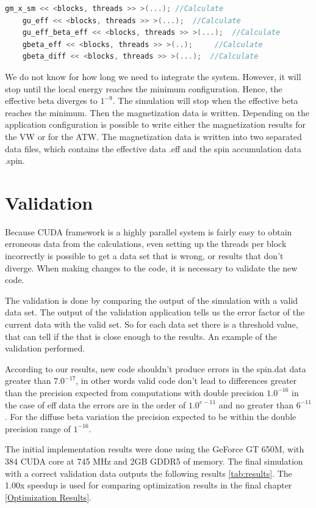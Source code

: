 \begin{lstlisting}[language=C++, label={lst:beta}, caption={Calculate effective beta}]
    gm_x_sm << <blocks, threads >> >(...); //Calculate
    gu_eff << <blocks, threads >> >(...);  //Calculate 
    gu_eff_beta_eff << <blocks, threads >> >(...); 	//Calculate
    gbeta_eff << <blocks, threads >> >(..); 	//Calculate
    gbeta_diff << <blocks, threads >> >(...);  //Calculate             
\end{lstlisting}


We do not know for how long we need to integrate the system. However, it will stop until the local energy reaches the minimum configuration. Hence, the effective beta diverges to $1^{-9}$. The simulation will stop when the effective beta reaches the minimum. Then the magnetization data is written. Depending on the application configuration is possible to write either the magnetization results for the VW or for the ATW. The magnetization data is written into two separated data files, which contains the effective data .eff and the spin accumulation data .spin.

\section{Validation}

Because CUDA framework is a highly parallel system is fairly easy to obtain erroneous data from the calculations, even setting up the threads per block incorrectly is possible to get a data set that is wrong, or results that don't diverge. When making changes to the code, it is necessary to validate the new code.

The validation is done by comparing the output of the simulation with a valid data set. The output of the validation application tells us the error factor of the current data with the valid set. So for each data set there is a threshold value, that can tell if the that is close enough to the results. An example of the validation performed.

According to our results, new code shouldn't produce errors in the spin.dat data greater than $7.0^{-17}$, in other words valid code don't lead to differences greater than the precision expected from computations with double precision $1.0^{-16}$ in the case of eff data the errors are in the order of $1.0^{e-11}$ and no greater than $6^{-11}$. For the diffuse beta variation the precision expected to be within the double precision range of $1^{-16}$. 

The initial implementation results were done using the GeForce GT 650M, with 384 CUDA core at 745 MHz and 2GB GDDR5 of memory. The final simulation with a correct validation data outputs the following results \ref{tab:results}. The 1.00x speedup is used for comparing optimization results in the final chapter \ref{Optimization Results}.

